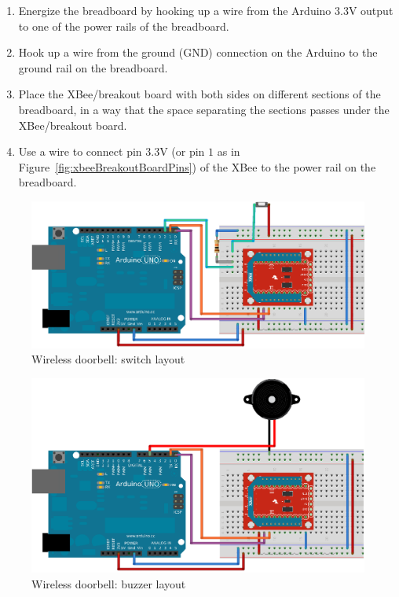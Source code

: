 \begin{enumerate}
  \item Energize the breadboard by hooking up a {\color{red}{red}} wire from the Arduino $3.3$V output to one of the power rails of the breadboard.
  \item Hook up a {\color{blue}{blue}} wire from the ground (GND) connection on the Arduino to the ground rail on the breadboard.
  \item Place the XBee/breakout board with both sides on different sections of the breadboard, in a way that the space separating the sections passes under the XBee/breakout board.
  \item Use a {\color{red}{red}} wire to connect pin $3.3$V (or pin $1$ as in Figure~\ref{fig:xbeeBreakoutBoardPins}) of the XBee to the power rail on the breadboard.
\end{enumerate}


\begin{figure}[htbp]
  \centering
  \includegraphics[width=\linewidth]{figures/doorbellSwitch-NEW.eps}
  \caption{Wireless doorbell: switch layout
  \label{fig:wirelessDoorbellSwitch}}
\end{figure}

\begin{figure}[htbp]
  \centering
  \includegraphics[width=\linewidth]{figures/doorbellBuzzer-NEW.eps}
  \caption{Wireless doorbell: buzzer layout
  \label{fig:wirelessDoorbellBuzzer}}
\end{figure}
